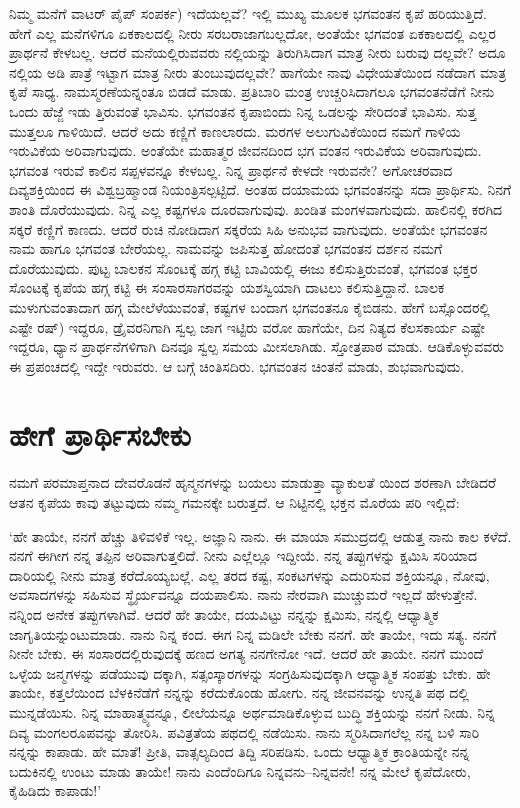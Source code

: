 ನಿಮ್ಮ ಮನೆಗೆ ವಾಟರ್ ಪೈಪ್ ಸಂಪರ್ಕ) ಇದೆಯಲ್ಲವೆ? ಇಲ್ಲಿ ಮುಖ್ಯ ಮೂಲಕ ಭಗವಂತನ ಕೃಪೆ ಹರಿಯುತ್ತಿದೆ. ಹೇಗೆ ಎಲ್ಲ ಮನೆಗಳಿಗೂ ಏಕಕಾಲದಲ್ಲಿ ನೀರು ಸರಬರಾಜಾಗಬಲ್ಲದೋ, ಅಂತೆಯೇ ಭಗವಂತ ಏಕಕಾಲದಲ್ಲಿ ಎಲ್ಲರ ಪ್ರಾರ್ಥನೆ ಕೇಳಬಲ್ಲ. ಆದರೆ ಮನೆಯಲ್ಲಿರುವವರು ನಲ್ಲಿಯನ್ನು ತಿರುಗಿಸಿದಾಗ ಮಾತ್ರ ನೀರು ಬರುವು ದಲ್ಲವೇ? ಅದೂ ನಲ್ಲಿಯ ಅಡಿ ಪಾತ್ರೆ ಇಟ್ಟಾಗ ಮಾತ್ರ ನೀರು ತುಂಬುವುದಲ್ಲವೇ? ಹಾಗೆಯೇ ನಾವು ವಿಧೇಯತೆಯಿಂದ ನಡೆದಾಗ ಮಾತ್ರ ಕೃಪೆ ಸಾಧ್ಯ. ನಾಮಸ್ಮರಣೆಯನ್ನಂತೂ ಬಿಡದೆ ಮಾಡು. ಪ್ರತಿಬಾರಿ ಮಂತ್ರ ಉಚ್ಚರಿಸಿದಾಗಲೂ ಭಗವಂತನೆಡೆಗೆ ನೀನು ಒಂದು ಹೆಜ್ಜೆ ಇಡು ತ್ತಿರುವಂತೆ ಭಾವಿಸು. ಭಗವಂತನ ಕೃಪಾಬಿಂದು ನಿನ್ನ ಒಡಲನ್ನು ಸೇರಿದಂತೆ ಭಾವಿಸು. ಸುತ್ತ ಮುತ್ತಲೂ ಗಾಳಿಯಿದೆ. ಆದರೆ ಅದು ಕಣ್ಣಿಗೆ ಕಾಣಲಾರದು. ಮರಗಳ ಅಲುಗುವಿಕೆಯಿಂದ ನಮಗೆ ಗಾಳಿಯ ಇರುವಿಕೆಯ ಅರಿವಾಗುವುದು. ಅಂತೆಯೇ ಮಹಾತ್ಮರ ಜೀವನದಿಂದ ಭಗ ವಂತನ ಇರುವಿಕೆಯ ಅರಿವಾಗುವುದು. ಭಗವಂತ ಇರುವೆ ಕಾಲಿನ ಸಪ್ಪಳವನ್ನೂ ಕೇಳಬಲ್ಲ. ನಿನ್ನ ಪ್ರಾರ್ಥನೆ ಕೇಳದೇ ಇರುವನೇ? ಅಗೋಚರವಾದ ದಿವ್ಯಶಕ್ತಿಯಿಂದ ಈ ವಿಶ್ವಬ್ರಹ್ಮಾಂಡ ನಿಯಂತ್ರಿಸಲ್ಪಟ್ಟಿದೆ. ಅಂತಹ ದಯಾಮಯ ಭಗವಂತನನ್ನು ಸದಾ ಪ್ರಾರ್ಥಿಸು. ನಿನಗೆ ಶಾಂತಿ ದೊರೆಯುವುದು. ನಿನ್ನ ಎಲ್ಲ ಕಷ್ಟಗಳೂ ದೂರವಾಗುವುವು. ಖಂಡಿತ ಮಂಗಳವಾಗುವುದು. ಹಾಲಿನಲ್ಲಿ ಕರಗಿದ ಸಕ್ಕರೆ ಕಣ್ಣಿಗೆ ಕಾಣದು. ಆದರೆ ರುಚಿ ನೋಡಿದಾಗ ಸಕ್ಕರೆಯ ಸಿಹಿ ಅನುಭವ ವಾಗುವುದು. ಅಂತೆಯೇ ಭಗವಂತನ ನಾಮ ಹಾಗೂ ಭಗವಂತ ಬೇರೆಯಲ್ಲ. ನಾಮವನ್ನು ಜಪಿಸುತ್ತ ಹೋದಂತೆ ಭಗವಂತನ ದರ್ಶನ ನಮಗೆ ದೊರೆಯುವುದು. ಪುಟ್ಟ ಬಾಲಕನ ಸೊಂಟಕ್ಕೆ ಹಗ್ಗ ಕಟ್ಟಿ ಬಾವಿಯಲ್ಲಿ ಈಜು ಕಲಿಸುತ್ತಿರುವಂತೆ, ಭಗವಂತ ಭಕ್ತರ ಸೊಂಟಕ್ಕೆ ಕೃಪೆಯ ಹಗ್ಗ ಕಟ್ಟಿ ಈ ಸಂಸಾರಸಾಗರವನ್ನು ಯಶಸ್ವಿಯಾಗಿ ದಾಟಲು ಕಲಿಸುತ್ತಿದ್ದಾನೆ. ಬಾಲಕ ಮುಳುಗುವಂತಾದಾಗ ಹಗ್ಗ ಮೇಲೆಳೆಯುವಂತೆ, ಕಷ್ಟಗಳ ಬಂದಾಗ ಭಗವಂತನೂ ಕೈಬಿಡನು. ಹೇಗೆ ಬಸ್ಸೊಂದರಲ್ಲಿ ಎಷ್ಟೇ ರಷ್​) ಇದ್ದರೂ, ಡ್ರೈವರನಿಗಾಗಿ ಸ್ವಲ್ಪ ಜಾಗ ಇಟ್ಟಿರು ವರೋ ಹಾಗೆಯೇ, ದಿನ ನಿತ್ಯದ ಕೆಲಸಕಾರ್ಯ ಎಷ್ಟೇ ಇದ್ದರೂ, ಧ್ಯಾನ ಪ್ರಾರ್ಥನೆಗಳಿಗಾಗಿ ದಿನವೂ ಸ್ವಲ್ಪ ಸಮಯ ಮೀಸಲಾಗಿಡು. ಸ್ತೋತ್ರಪಾಠ ಮಾಡು. ಆಡಿಕೊಳ್ಳುವವರು ಈ ಪ್ರಪಂಚದಲ್ಲಿ ಇದ್ದೇ ಇರುವರು. ಆ ಬಗ್ಗೆ ಚಿಂತಿಸದಿರು. ಭಗವಂತನ ಚಿಂತನೆ ಮಾಡು, ಶುಭವಾಗುವುದು.


\section{ಹೇಗೆ ಪ್ರಾರ್ಥಿಸಬೇಕು}

ನಮಗೆ ಪರಮಾಪ್ತನಾದ ದೇವರೊಡನೆ ಹೃನ್ಮನಗಳನ್ನು ಬಯಲು ಮಾಡುತ್ತಾ ವ್ಯಾಕುಲತೆ ಯಿಂದ ಶರಣಾಗಿ ಬೇಡಿದರೆ ಆತನ ಕೃಪೆಯ ಕಾವು ತಟ್ಟುವುದು ನಮ್ಮ ಗಮನಕ್ಕೇ ಬರುತ್ತದೆ. ಆ ನಿಟ್ಟಿನಲ್ಲಿ ಭಕ್ತನ ಮೊರೆಯ ಪರಿ ಇಲ್ಲಿದೆ:

‘ಹೇ ತಾಯೇ, ನನಗೆ ಹೆಚ್ಚು ತಿಳಿವಳಿಕೆ ಇಲ್ಲ. ಅಜ್ಞಾನಿ ನಾನು. ಈ ಮಾಯಾ ಸಮುದ್ರದಲ್ಲಿ ಆಡುತ್ತ ನಾನು ಕಾಲ ಕಳೆದೆ. ನನಗೆ ಈಗೀಗ ನನ್ನ ತಪ್ಪಿನ ಅರಿವಾಗುತ್ತಲಿದೆ. ನೀನು ಎಲ್ಲೆಲ್ಲೂ ಇದ್ದೀಯೆ. ನನ್ನ ತಪ್ಪುಗಳನ್ನು ಕ್ಷಮಿಸಿ ಸರಿಯಾದ ದಾರಿಯಲ್ಲಿ ನೀನು ಮಾತ್ರ ಕರೆದೊಯ್ಯಬಲ್ಲೆ. ಎಲ್ಲ ತರದ ಕಷ್ಟ, ಸಂಕಟಗಳನ್ನು ಎದುರಿಸುವ ಶಕ್ತಿಯನ್ನೂ, ನೋವು, ಅವಸಾದಗಳನ್ನು ಸಹಿಸುವ ಸ್ಥೈರ್ಯವನ್ನೂ ದಯಪಾಲಿಸು. ನಾನು ನೇರವಾಗಿ ಮುಚ್ಚುಮರೆ ಇಲ್ಲದೆ ಹೇಳುತ್ತೇನೆ. ನನ್ನಿಂದ ಅನೇಕ ತಪ್ಪುಗಳಾಗಿವೆ. ಆದರೆ ಹೇ ತಾಯೇ, ದಯವಿಟ್ಟು ನನ್ನನ್ನು ಕ್ಷಮಿಸು, ನನ್ನಲ್ಲಿ ಆಧ್ಯಾತ್ಮಿಕ ಜಾಗೃತಿಯನ್ನುಂಟುಮಾಡು. ನಾನು ನಿನ್ನ ಕಂದ. ಈಗ ನಿನ್ನ ಮಡಿಲೇ ಬೇಕು ನನಗೆ. ಹೇ ತಾಯೇ, ಇದು ಸತ್ಯ. ನನಗೆ ನೀನೇ ಬೇಕು. ಈ ಸಂಸಾರದಲ್ಲಿರುವುದಕ್ಕೆ ಹಣದ ಅಗತ್ಯ ನನಗೇನೋ ಇದೆ. ಆದರೆ ಹೇ ತಾಯೇ. ನನಗೆ ಮುಂದೆ ಒಳ್ಳೆಯ ಜನ್ಮಗಳನ್ನು ಪಡೆಯುವು ದಕ್ಕಾಗಿ, ಸತ್ಸಂಸ್ಕಾರಗಳನ್ನು ಸಂಗ್ರಹಿಸುವುದಕ್ಕಾಗಿ ಆಧ್ಯಾತ್ಮಿಕ ಸಂಪತ್ತು ಬೇಕು. ಹೇ ತಾಯೇ, ಕತ್ತಲೆಯಿಂದ ಬೆಳಕಿನೆಡೆಗೆ ನನ್ನನ್ನು ಕರೆದುಕೊಂಡು ಹೋಗು. ನನ್ನ ಜೀವನವನ್ನು ಉನ್ನತಿ ಪಥ ದಲ್ಲಿ ಮುನ್ನಡೆಯಿಸು. ನಿನ್ನ ಮಾಹಾತ್ಮ್ಯವನ್ನೂ, ಲೀಲೆಯನ್ನೂ ಅರ್ಥಮಾಡಿಕೊಳ್ಳುವ ಬುದ್ಧಿ ಶಕ್ತಿಯನ್ನು ನನಗೆ ನೀಡು. ನಿನ್ನ ದಿವ್ಯ ಮಂಗಲರೂಪವನ್ನು ತೋರಿಸಿ. ಪವಿತ್ರತೆಯ ಪಥದಲ್ಲಿ ನಡೆಯಿಸು. ನಾನು ಸ್ಮರಿಸಿದಾಗಲೆಲ್ಲ ನನ್ನ ಬಳಿ ಸಾರಿ ನನ್ನನ್ನು ಕಾಪಾಡು. ಹೇ ಮಾತೆ! ಪ್ರೀತಿ, ವಾತ್ಸಲ್ಯದಿಂದ ತಿದ್ದಿ ಸರಿಪಡಿಸು. ಒಂದು ಆಧ್ಯಾತ್ಮಿಕ ಕ್ರಾಂತಿಯನ್ನೇ ನನ್ನ ಬದುಕಿನಲ್ಲಿ ಉಂಟು ಮಾಡು ತಾಯೇ! ನಾನು ಎಂದೆಂದಿಗೂ ನಿನ್ನವನು–ನಿನ್ನವನೇ! ನನ್ನ ಮೇಲೆ ಕೃಪೆದೋರು, ಕೈಹಿಡಿದು ಕಾಪಾಡು!’

